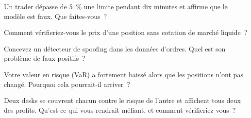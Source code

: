 \begin{interviewq}\label{iq:in:risk-operations-product-control-and-compliance:2}
Un trader dépasse de 5~\% une limite pendant dix minutes et affirme que le modèle est faux. Que faites-vous~?
\end{interviewq}

\begin{interviewq}\label{iq:in:risk-operations-product-control-and-compliance:3}
Comment vérifieriez-vous le prix d'une position sans cotation de marché liquide~?
\end{interviewq}

\begin{interviewq}\label{iq:in:risk-operations-product-control-and-compliance:4}
Concevez un détecteur de spoofing dans les données d'ordres. Quel est son problème de faux positifs~?
\end{interviewq}

\begin{interviewq}\label{iq:in:risk-operations-product-control-and-compliance:5}
Votre valeur en risque (VaR) a fortement baissé alors que les positions n'ont pas changé. Pourquoi cela pourrait-il arriver~?
\end{interviewq}

\begin{interviewq}\label{iq:in:risk-operations-product-control-and-compliance:6}
Deux desks se couvrent chacun contre le risque de l'autre et affichent tous deux des profits. Qu'est-ce qui vous rendrait méfiant, et comment vérifieriez-vous~?
\end{interviewq}
